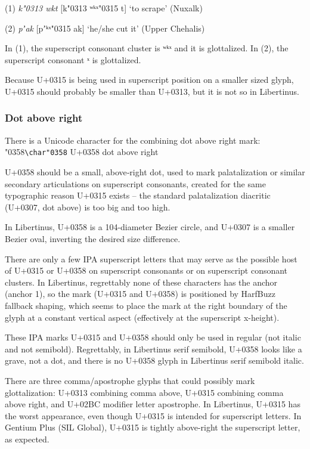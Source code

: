 \documentclass[landscape]{article}
\newcommand{\gs}{\hspace{0.5mm}}	%
\begin{document}
(1) {\itshape k\char"0313 wkt}
[k\char"0313 ʷᵏˣ\char"0315 t]
‘to scrape’
(Nuxalk)

(2) {\itshape pʼak}
[pʼᵏˣ\char"0315 ak]
`he/she cut it' 
(Upper Chehalis)

In (1), the superscript consonant cluster is ʷᵏˣ and it is glottalized.
In (2), the superscript consonant ˣ is glottalized.

Because U+0315 is being used in superscript position on a smaller sized glyph, U+0315 should probably be 
smaller than U+0313, but it is not so in Libertinus.

\subsubsection*{Dot above right}

There is a Unicode character for the combining dot above right mark: 
 \char"0358\gs \verb|\char"0358| U+0358 dot above right

U+0358 should be a small, above‑right dot, used to mark palatalization or similar secondary articulations on superscript consonants, created for the same typographic reason U+0315 exists -- the standard palatalization diacritic (U+0307, dot above) is too big and too high.

In Libertinus, U+0358 is a 104-diameter Bezier circle, and U+0307 is a smaller Bezier oval, 
inverting the desired size difference.

There are only a few IPA superscript letters that may serve as the possible host of U+0315 or U+0358 
on superscript consonants or on superscript consonant clusters.
In Libertinus, regrettably none of these characters has the anchor (anchor 1), so the mark (U+0315 and U+0358) is positioned by HarfBuzz fallback shaping, which seems to place the mark at the right boundary of the glyph at a constant vertical aspect (effectively at the superscript x-height).

These IPA marks U+0315 and U+0358 should only be used in regular (not italic and not semibold).
Regrettably, in Libertinus serif semibold, U+0358 looks like a grave, not a dot, and there is no U+0358 glyph in Libertinus serif semibold italic.

There are three comma/apostrophe glyphs that could possibly mark glottalization: 
U+0313 combining comma above, U+0315 combining comma above right, and U+02BC modifier letter apostrophe.
In Libertinus, U+0315 has the worst appearance, even though U+0315 is intended for superscript letters.
In Gentium Plus (SIL Global), U+0315 is tightly above-right the superscript letter, as expected.
\end{document}
